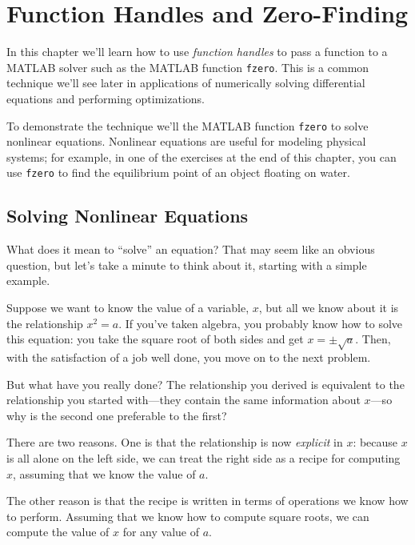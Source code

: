 \documentclass[../../book.tex]{subfiles}
\begin{document}
\chapter{Function Handles and Zero-Finding}
\label{fzero}

In this chapter we'll learn how to use \emph{function handles} to pass a function to a MATLAB solver such as the MATLAB function \lstinline{fzero}.   This is a common technique we'll see later in applications of numerically solving differential equations and performing optimizations.

To demonstrate the technique we'll the MATLAB function \lstinline{fzero} to solve nonlinear equations.
Nonlinear equations are useful for modeling physical systems; for example, in one of
the exercises at the end of this chapter, you can use \lstinline{fzero} to find the equilibrium point of an object floating on water.

\section{Solving Nonlinear Equations}


What does it mean to ``solve'' an equation?  That may seem like an
obvious question, but let's take a minute to think about it,
starting with a simple \mbox{example}.

Suppose we want to know the
value of a variable, $x$, but all we know about it is the relationship
$x^2 = a$. If you've taken algebra, you probably  know how to solve this
equation: you take the square root of both sides and get
$x = \pm \sqrt{a}$.  Then, with the satisfaction of a job well done,
you move on to the next problem.


But what have you really done?  The relationship you derived is
equivalent to the relationship you started with---they contain the
same information about $x$---so why is the second one preferable
to the first?

There are two reasons.  One is that the relationship is now \emph{explicit} in $x$: because $x$ is all alone on the left side, we can treat the right side as a recipe for computing $x$, assuming that we know the value of $a$.


The other reason is that the recipe is written in terms of operations
we know how to perform.  Assuming that we know how to compute square
roots, we can compute the value of $x$ for any value of $a$.
\end{document}

